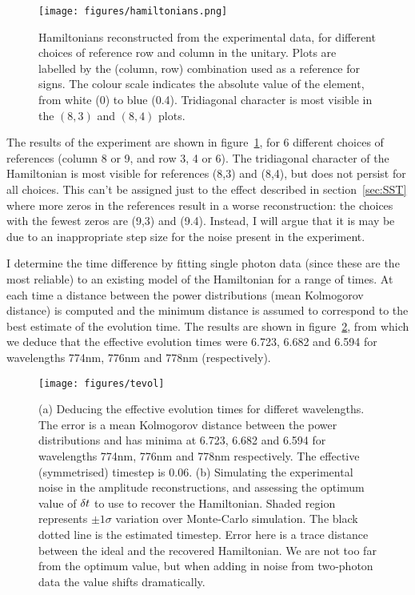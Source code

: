\begin{figure}
  \centering
  \texttt{[image: figures/hamiltonians.png]}
  \caption[Reconstructed Hamiltonians]
  {Hamiltonians reconstructed from the experimental data, for different choices
  of reference row and column in the unitary. Plots are labelled by the (column,
  row) combination used as a reference for signs. The colour scale indicates the
  absolute value of the element, from white (0) to blue (0.4). Tridiagonal
  character is most visible in the \(\left(8,3\right)\) and \(\left(8,4\right)\)
  plots.}
  \label{fig:hamiltonians}
\end{figure}

The results of the experiment are shown in figure~\ref{fig:hamiltonians}, for 6
different choices of references (column 8 or 9, and row 3, 4 or 6). The
tridiagonal character of the Hamiltonian is most visible for references (8,3)
and (8,4), but does not persist for all choices. This can't be assigned just to
the effect described in section~\ref{sec:SST} where more zeros in the references
result in a worse reconstruction: the choices with the fewest zeros are (9,3)
and (9.4). Instead, I will argue that it is may be due to an inappropriate step
size for the noise present in the experiment.

I determine the time difference by fitting single photon data (since these are
the most reliable) to an existing model of the Hamiltonian  for a range of times. At each time a distance between the power
distributions (mean Kolmogorov distance) is computed and the minimum distance is
assumed to correspond to the best estimate of the evolution time. The results
are shown in figure~\ref{fig:tevol}, from which we deduce that the effective
evolution times were 6.723, 6.682 and 6.594 for wavelengths 774nm, 776nm and
778nm (respectively).

\begin{figure}
  \centering
  \texttt{[image: figures/tevol]}
  \caption[Deducing the effective evolution times for different wavelengths]
  {(a) Deducing the effective evolution times for differet wavelengths. The
  error is a mean Kolmogorov distance between the power distributions and has
  minima at 6.723, 6.682 and 6.594 for wavelengths 774nm, 776nm and 778nm
  respectively. The effective (symmetrised) timestep is 0.06. (b) Simulating the
  experimental noise in the amplitude reconstructions, and assessing the optimum
  value of \(\delta t\) to use to recover the Hamiltonian. Shaded region represents
  \(\pm 1 \sigma\) variation over Monte-Carlo simulation. The black dotted line
  is the estimated timestep. Error here is a trace distance between the ideal
  and the recovered Hamiltonian. We are not too far from the optimum value, but
  when adding in noise from two-photon data the value shifts dramatically.}
  \label{fig:tevol}
\end{figure}


